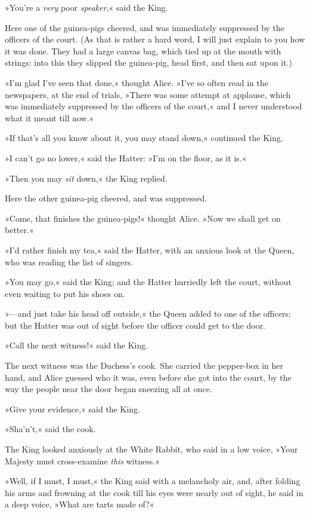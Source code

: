 »You're a \textit{very} poor \textit{speaker},« said the King.

Here one of the guinea-pigs cheered, and was immediately suppressed by the officers of the court. (As that is rather a hard word, I will just explain to you how it was done. They had a large canvas bag, which tied up at the mouth with strings: into this they slipped the guinea-pig, head first, and then sat upon it.)

»I'm glad I've seen that done,« thought Alice. »I've so often read in the newspapers, at the end of trials, »There was some attempt at applause, which was immediately suppressed by the officers of the court,« and I never understood what it meant till now.«

»If that's all you know about it, you may stand down,« continued the King.

»I can't go no lower,« said the Hatter: »I'm on the floor, as it is.«

»Then you may \textit{sit} down,« the King replied.

Here the other guinea-pig cheered, and was suppressed.

»Come, that finishes the guinea-pigs!« thought Alice. »Now we shall get on better.«

»I'd rather finish my tea,« said the Hatter, with an anxious look at the Queen, who was reading the list of singers.

»You may go,« said the King; and the Hatter hurriedly left the court, without even waiting to put his shoes on.

»—and just take his head off outside,« the Queen added to one of the officers; but the Hatter was out of sight before the officer could get to the door.

»Call the next witness!« said the King.

The next witness was the Duchess's cook. She carried the pepper-box in her hand, and Alice guessed who it was, even before she got into the court, by the way the people near the door began sneezing all at once.

»Give your evidence,« said the King.

»Sha'n't,« said the cook.

The King looked anxiously at the White Rabbit, who said in a low voice, »Your Majesty must cross-examine \textit{this} witness.«

»Well, if I must, I must,« the King said with a melancholy air, and, after folding his arms and frowning at the cook till his eyes were nearly out of sight, he said in a deep voice, »What are tarts made of?«

